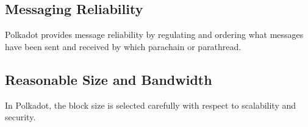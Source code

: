 \subsection{Messaging Reliability} Polkadot provides message reliability by regulating and ordering what messages have been sent and received by which parachain or parathread.

\subsection{Reasonable Size and Bandwidth} In Polkadot, the block size is selected carefully with respect to scalability and security. 


